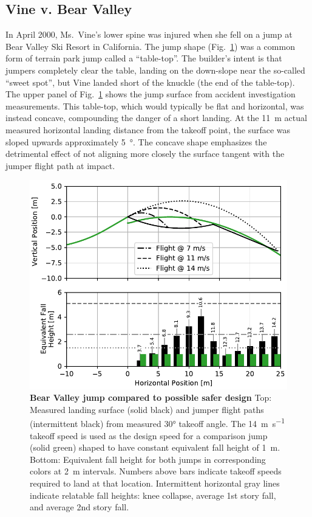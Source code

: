 \documentclass[smallextended]{svjour3}       %
\begin{document}
\subsection{Vine v. Bear Valley}
\label{sec:vine}
%
In April 2000, Ms.~Vine's lower spine was injured when she fell on a jump at
Bear Valley Ski Resort in California. The jump shape
(Fig.~\ref{fig:vine-v-bear-valley}) was a common form of terrain park jump
called a ``table-top''. The builder's intent is that jumpers completely clear
the table, landing on the down-slope near the so-called ``sweet spot'', but
Vine landed short of the knuckle (the end of the table-top). The upper panel of
Fig.~\ref{fig:vine-v-bear-valley} shows the jump surface from accident
investigation measurements. This table-top, which would typically be flat and
horizontal, was instead concave, compounding the danger of a short landing. At
the 11~\si{\meter} actual measured horizontal landing distance from the takeoff
point, the surface was sloped upwards approximately 5~\si{\degree}. The concave
shape emphasizes the detrimental effect of not aligning more closely the
surface tangent with the jumper flight path at impact.
%
\begin{figure}
  \centering
  \includegraphics[width=5.25in]{figures/vine-v-bear-valley.pdf}
  \caption{\textbf{Bear Valley jump compared to possible safer design}
  Top: Measured landing surface (solid black) and jumper flight paths
  (intermittent black) from measured 30\si{\degree} takeoff angle. The
  14~\si{\meter\per\second} takeoff speed is used as the design speed \cite{Levy2015} for a
  comparison jump (solid green) shaped to have constant equivalent fall
  height of 1~\si{\meter}.
  Bottom: Equivalent fall height for both jumps in corresponding
  colors at 2~\si{\meter} intervals. Numbers above bars indicate
  takeoff speeds required to land at that location.
  Intermittent horizontal gray lines indicate relatable fall heights: knee
  collapse, average 1st story fall, and average 2nd story fall.
  }
  \label{fig:vine-v-bear-valley}
\end{figure}
\end{document}
